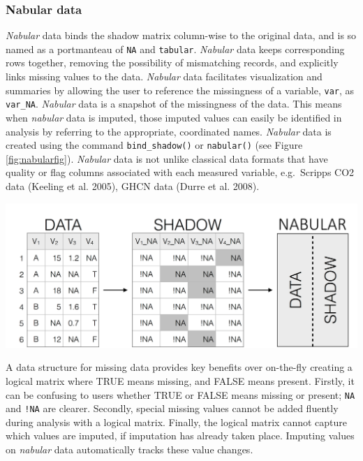 \documentclass[]{article}
\let\origfigure\figure
\let\endorigfigure\endfigure
\renewenvironment{figure}[1][2] {
    \expandafter\origfigure\expandafter[H]
} {
    \endorigfigure
}
\theoremstyle{definition}
\theoremstyle{definition}
\theoremstyle{definition}
\theoremstyle{remark}
\begin{document}
\hypertarget{nabular-data}{%
\subsubsection{Nabular data}\label{nabular-data}}

\emph{Nabular} data binds the shadow matrix column-wise to the original
data, and is so named as a portmanteau of \texttt{NA} and
\texttt{tabular}. \emph{Nabular} data keeps corresponding rows together,
removing the possibility of mismatching records, and explicitly links
missing values to the data. \emph{Nabular} data facilitates
visualization and summaries by allowing the user to reference the
missingness of a variable, \texttt{var}, as \texttt{var\_NA}.
\emph{Nabular} data is a snapshot of the missingness of the data. This
means when \emph{nabular} data is imputed, those imputed values can
easily be identified in analysis by referring to the appropriate,
coordinated names. \emph{Nabular} data is created using the command
\texttt{bind\_shadow()} or \texttt{nabular()} (see Figure
\ref{fig:nabularfig}). \emph{Nabular} data is not unlike classical data
formats that have quality or flag columns associated with each measured
variable, e.g.~Scripps CO2 data (Keeling et al. 2005), GHCN data (Durre
et al. 2008).

\begin{figure}

{\centering \includegraphics[width=1\linewidth]{nabular} 

}

\caption{The process of creating nabular data. Data transformed to shadow matrix, and nabular data contains the shadow matrix, column bound to the data. Nabular data can be created using `bind\_shadow` or `nabular()` functions. Nabular data provides a useful format for missing data exploration and analysis.}\label{fig:nabularfig}
\end{figure}

A data structure for missing data provides key benefits over on-the-fly
creating a logical matrix where TRUE means missing, and FALSE means
present. Firstly, it can be confusing to users whether TRUE or FALSE
means missing or present; \texttt{NA} and \texttt{!NA} are clearer.
Secondly, special missing values cannot be added fluently during
analysis with a logical matrix. Finally, the logical matrix cannot
capture which values are imputed, if imputation has already taken place.
Imputing values on \emph{nabular} data automatically tracks these value
changes.
\end{document}
